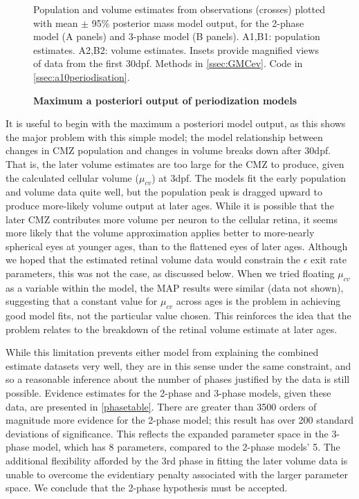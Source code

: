 \begin{figure}[!h]
    \caption{{\bf Maximum a posteriori output of periodization models}}
    \label{phaseMAPout}
    Population and volume estimates from observations (crosses) plotted with mean $\pm$ 95\% posterior mass model output, for the 2-phase model (A panels) and 3-phase model (B panels). A1,B1: population estimates. A2,B2: volume estimates. Insets provide magnified views of data from the first 30dpf.
    Methods in \autoref{ssec:GMCev}.
    Code in \autoref{ssec:a10periodisation}.
\end{figure}

It is useful to begin with the maximum a posteriori model output, as this shows the major problem with this simple model; the model relationship between changes in CMZ population and changes in volume breaks down after 30dpf. That is, the later volume estimates are too large for the CMZ to produce, given the calculated cellular volume ($\mu_{cv}$) at 3dpf. The models fit the early population and volume data quite well, but the population peak is dragged upward to produce more-likely volume output at later ages. While it is possible that the later CMZ contributes more volume per neuron to the cellular retina, it seems more likely that the volume approximation applies better to more-nearly spherical eyes at younger ages, than to the flattened eyes of later ages. Although we hoped that the estimated retinal volume data would constrain the $\epsilon$ exit rate parameters, this was not the case, as discussed below. When we tried floating $\mu_{cv}$ as a variable within the model, the MAP results were similar (data not shown), suggesting that a constant value for $\mu_{cv}$ across ages is the problem in achieving good model fits, not the particular value chosen. This reinforces the idea that the problem relates to the breakdown of the retinal volume estimate at later ages.

While this limitation prevents either model from explaining the combined estimate datasets very well, they are in this sense under the same constraint, and so a reasonable inference about the number of phases justified by the data is still possible. Evidence estimates for the 2-phase and 3-phase models, given these data, are presented in \autoref{phasetable}. There are greater than 3500 orders of magnitude more evidence for the 2-phase model; this result has over 200 standard deviations of significance. This reflects the expanded parameter space in the 3-phase model, which has 8 parameters, compared to the 2-phase models' 5. The additional flexibility afforded by the 3rd phase in fitting the later volume data is unable to overcome the evidentiary penalty associated with the larger parameter space. We conclude that the 2-phase hypothesis must be accepted.

